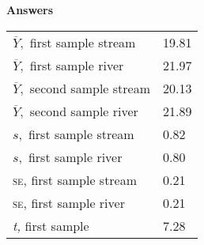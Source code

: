 \documentclass[12pt]{exam}
\begin{document}
\ifprintanswers

\textbf{Answers}

\begin{tabular}{ll}
\toprule
$\overline{Y},$ first sample stream & 19.81 \\
$\overline{Y},$ first sample river & 21.97 \\
\midrule
$\overline{Y},$ second sample stream  & 20.13 \\
$\overline{Y},$ second sample river & 21.89 \\
\midrule
$s,$ first sample stream & 0.82 \\
$s,$ first sample river	& 0.80 \\
\midrule
\textsc{se,} first sample stream & 0.21 \\
\textsc{se,} first sample river & 0.21 \\
\midrule
\emph{t,} first sample	& 7.28 \\
\bottomrule
\end{tabular}

\fi
\end{document}
